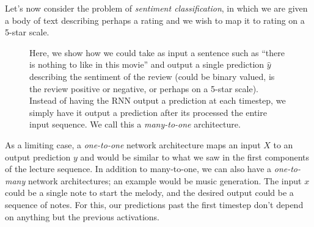 \documentclass[12pt]{article}
\begin{document}
Let's now consider the problem of \emph{sentiment classification}, in which we are given a body of text describing perhaps a rating and we wish to map it to rating on a 5-star scale.
\begin{figure}[h]
  \centering
  \caption{\footnotesize Here, we show how we could take as input a sentence such as ``there is nothing to like in this movie'' and output a single prediction $\hat y$ describing the sentiment of the review (could be binary valued, is the review positive or negative, or perhaps on a 5-star scale). Instead of having the RNN output a prediction at each timestep, we simply have it output a prediction after its processed the entire input sequence. We call this a \emph{many-to-one} architecture.}
\end{figure}
As a limiting case, a \emph{one-to-one} network architecture maps an input $X$ to an output prediction $y$ and would be similar to what we saw in the first components of the lecture sequence. In addition to many-to-one, we can also have a \emph{one-to-many} network architectures; an example would be music generation. The input $x$ could be a single note to start the melody, and the desired output could be a sequence of notes. For this, our predictions past the first timestep don't depend on anything but the previous activations.
\end{document}
